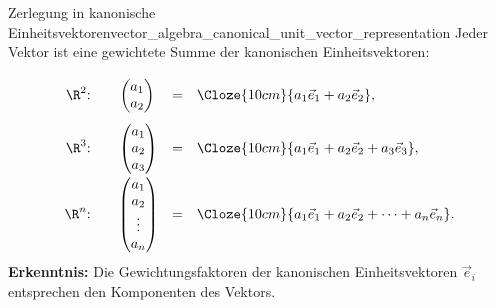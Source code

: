 \begin{KeyPointBox}{Zerlegung in kanonische Einheitsvektoren}{vector_algebra_canonical_unit_vector_representation}
  Jeder Vektor ist eine gewichtete Summe der kanonischen Einheitsvektoren:
  \[
    \begin{array}{@{}r@{:\qquad}c@{\quad=\quad}l@{}}
      \R^2
        & \begin{pmatrix}a_1\\a_2\end{pmatrix}
          \vphantom{\begin{pmatrix}a_1\\a_2\\a_3\end{pmatrix}}
        & \Cloze{10cm}{a_1\vec e_1+a_2\vec e_2},\\[1.4em]
      \R^3
        & \begin{pmatrix}a_1\\a_2\\a_3\end{pmatrix}
        & \Cloze{10cm}{a_1\vec e_1+a_2\vec e_2+a_3\vec e_3},\\[1.4em]
      \R^n
        & \begin{pmatrix}a_1\\a_2\\\vdots\\a_n\end{pmatrix}
        & \Cloze{10cm}{a_1\vec e_1+a_2\vec e_2+\dots+a_n\vec e_n}.
    \end{array}
  \]
  \textbf{Erkenntnis:} Die Gewichtungsfaktoren der kanonischen Einheitsvektoren $\vec{e}_i$
  entsprechen den Komponenten des Vektors.
\end{KeyPointBox}
